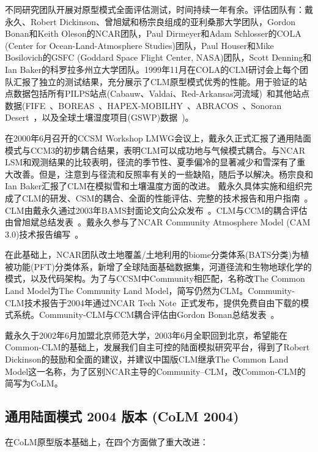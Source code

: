 不同研究团队开展对原型模式全面评估测试，时间持续一年有余。评估团队有：戴永久、Robert Dickinson、曾旭斌和杨宗良组成的亚利桑那大学团队，Gordon Bonan和Keith Oleson的NCAR团队，Paul Dirmeyer和Adam Schlosser的COLA (Center for Ocean-Land-Atmosphere Studies)团队，Paul Houser和Mike Bosilovich的GSFC (Goddard Space Flight Center, NASA)团队，Scott Denning和Ian Baker的科罗拉多州立大学团队。1999年11月在COLA的CLM研讨会上每个团队汇报了独立的测试结果，充分展示了CLM原型模式优秀的性能。用于验证的站点数据包括所有PILPS站点(Cabauw、Valdai、Red-Arkansas河流域)~\citep{Henderson-Sellers_1993_PILPS}和其他站点数据(FIFE~\citep{Sellers88FIFE}、BOREAS~\citep{Sellers95BOREAS}、HAPEX-MOBILHY~\citep{Andre1986hapex}、ABRACOS~\citep{Gash96ABRACOS}、Sonoran Desert~\citep{Unland1996surface}，以及全球土壤湿度项目(GSWP)数据~\citep{Dirmeyer1999global})。

在2000年6月召开的CCSM Workshop LMWG会议上，戴永久正式汇报了通用陆面模式与CCM3的初步耦合结果，表明CLM可以成功地与气候模式耦合。与NCAR LSM和观测结果的比较表明，径流的季节性、夏季偏冷的显著减少和雪深有了重大改善。但是，注意到与径流和反照率有关的一些缺陷，随后予以解决。杨宗良和Ian Baker汇报了CLM在模拟雪和土壤温度方面的改进。
戴永久具体实施和组织完成了CLM的研发、CSM的耦合、全面的性能评估、完整的技术报告和用户指南~\citep{Dai2001CoLM}。CLM由戴永久通过2003年BAMS封面论文向公众发布~\citep{dai2003common}。CLM与CCM的耦合评估由曾旭斌总结发表~\citep{zeng2002coupling}。戴永久参与了NCAR Community Atmosphere Model (CAM 3.0)技术报告编写~\citep{Collins2004CAM}。

在此基础上，NCAR团队改土地覆盖/土地利用的biome分类体系(BATS分类)为植被功能(PFT)分类体系，新增了全球陆面基础数据集，河道径流和生物地球化学的模式，以及代码架构。为了与CCSM中Community相匹配，名称改The Common Land Model为The Community Land Model，简写仍然为CLM。Community-CLM技术报告于2004年通过NCAR Tech Note~\citep{Oleson2004CLM}正式发布，提供免费自由下载的模式系统。Community-CLM与CCM耦合评估由Gordon Bonan总结发表~\citep{Bonan2002CLM}。

戴永久于2002年6月加盟北京师范大学，2003年6月全职回到北京，希望能在Common-CLM的基础上，发展我们自主可控的陆面模拟研究平台，得到了Robert Dickinson的鼓励和全面的建议，并建议中国版CLM继承The Common Land Model这一名称，为了区别NCAR主导的Community–CLM，改Common-CLM的简写为CoLM。


\subsection{通用陆面模式 2004 版本 (CoLM 2004)}
在CoLM原型版本基础上，在四个方面做了重大改进：

